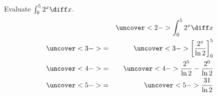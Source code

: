\begin{frame}
\begin{example}[Example 14, p. 417]
Evaluate $\int_0^5 2^x \diff x$.
\begin{eqnarray*}
& & \uncover<2->{\int_0^5 2^x \diff x}\\%
& \uncover<3->{ = } & \uncover<3->{\left[ \frac{2^x}{\ln 2}\right]_0^5}\\%
& \uncover<4->{ = } & \uncover<4->{\frac{2^5}{\ln 2} - \frac{2^0}{\ln 2}}\\%
& \uncover<5->{ = } & \uncover<5->{\frac{31}{\ln 2}}%
\end{eqnarray*}
\end{example}
\end{frame}
